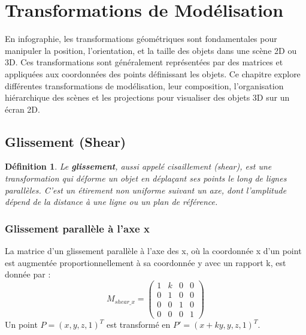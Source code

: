 \documentclass{article}
\newtheorem{definition}{Définition}
\begin{document}
\sloppy

\section{Transformations de Modélisation}

En infographie, les transformations géométriques sont fondamentales pour manipuler la position, l'orientation, et la taille des objets dans une scène 2D ou 3D. Ces transformations sont généralement représentées par des matrices et appliquées aux coordonnées des points définissant les objets. Ce chapitre explore différentes transformations de modélisation, leur composition, l'organisation hiérarchique des scènes et les projections pour visualiser des objets 3D sur un écran 2D.

\subsection{Glissement (Shear)}

\begin{definition}
Le \textbf{glissement}, aussi appelé cisaillement (shear), est une transformation qui déforme un objet en déplaçant ses points le long de lignes parallèles. C'est un étirement non uniforme suivant un axe, dont l'amplitude dépend de la distance à une ligne ou un plan de référence.
\end{definition}

\subsubsection{Glissement parallèle à l'axe x}
La matrice d'un glissement parallèle à l'axe des x, où la coordonnée x d'un point est augmentée proportionnellement à sa coordonnée y avec un rapport k, est donnée par :
\[
M_{shear\_x} = \begin{pmatrix}
1 & k & 0 & 0 \\
0 & 1 & 0 & 0 \\
0 & 0 & 1 & 0 \\
0 & 0 & 0 & 1
\end{pmatrix}
\]
Un point $P = (x, y, z, 1)^T$ est transformé en $P' = (x + ky, y, z, 1)^T$.
\end{document}
